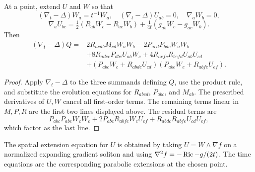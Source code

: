 \begin{theorem}
\label{thm:chow-ii-harnack-quadratic-evolution}


At a point, extend \(U\) and \(W\) so that
\[
(\nabla_t-\Delta)W_a=t^{-1}W_a,\quad
(\nabla_t-\Delta)U_{ab}=0,\quad \nabla_aW_b=0,
\]
\[
\nabla_aU_{bc}=\tfrac12(R_{ab}W_c-R_{ac}W_b)
+\tfrac1{4t}(g_{ab}W_c-g_{ac}W_b).
\]
Then
\[
\begin{aligned}
(\nabla_t-\Delta)Q={}&2R_{acdb}M_{cd}W_aW_b-2P_{acd}P_{bdc}W_aW_b\\
&+8R_{adec}P_{dbe}U_{ab}W_c+4R_{aefc}R_{befd}U_{ab}U_{cd}\\
&+(P_{abc}W_c+R_{abdc}U_{cd})
(P_{abe}W_e+R_{abfe}U_{ef}).
\end{aligned}
\]
\end{theorem}
\begin{proof}
\sketch Apply \(\nabla_t-\Delta\) to the three summands defining \(Q\), use the
product rule, and substitute the evolution equations for \(R_{abcd}\),
\(P_{abc}\), and \(M_{ab}\).  The prescribed derivatives of \(U,W\) cancel
all first-order terms.  The remaining terms linear in \(M,P,R\) are the first
two lines displayed above.  The residual terms are
\[
P_{abc}P_{abe}W_cW_e+2P_{abc}R_{abfe}W_cU_{ef}
+R_{abdc}R_{abfe}U_{cd}U_{ef},
\]
which factor as the last line.
\end{proof}

\begin{remark}
\label{rem:chow-ii-harnack-extension-soliton-motivation}

The spatial extension equation for \(U\) is obtained by taking
\(U=W\wedge\nabla f\) on a normalized expanding gradient soliton and using
\(\nabla^2f=-\operatorname{Ric}-g/(2t)\).  The time equations are the corresponding
parabolic extensions at the chosen point.
\end{remark}

